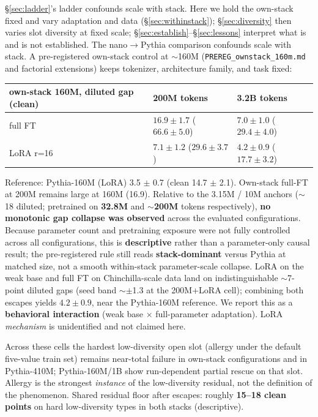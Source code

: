 \documentclass[11pt]{article}
\begin{document}
\S\ref{sec:ladder}'s ladder confounds scale with stack. Here we hold the own-stack fixed and vary adaptation and data (\S\ref{sec:withinstack}); \S\ref{sec:diversity} then varies slot diversity at fixed scale; \S\ref{sec:establish}--\S\ref{sec:lessons} interpret what is and is not established. The nano$\rightarrow$Pythia comparison confounds scale with stack. A pre-registered own-stack control at $\sim$160M (\texttt{PREREG\_ownstack\_160m.md} and factorial extensions) keeps tokenizer, architecture family, and task fixed:

 \begin{center}
\begin{tabular}{lll}
\toprule
own-stack 160M, diluted gap (clean) & 200M tokens & 3.2B tokens \\
\midrule
full FT & $\mathbf{16.9}\pm\mathbf{1.7}$ ($66.6\pm5.0$) & $\mathbf{7.0}\pm\mathbf{1.0}$ ($29.4\pm4.0$) \\
LoRA r=16 & $\mathbf{7.1}\pm\mathbf{1.2}$ ($29.6\pm3.7$) & $\mathbf{4.2}\pm\mathbf{0.9}$ ($17.7\pm3.2$) \\
\bottomrule
\end{tabular}
\end{center}

Reference: Pythia-160M (LoRA) 3.5 $\pm$ 0.7 (clean 14.7 $\pm$ 2.1). Own-stack full-FT at 200M remains large at 160M (16.9). Relative to the 3.15M / 10M anchors ($\sim$18 diluted; pretrained on \textbf{32.8M} and $\sim$\textbf{200M} tokens respectively), \textbf{no monotonic gap collapse was observed} across the evaluated configurations. Because parameter count and pretraining exposure were not fully controlled across all configurations, this is \textbf{descriptive} rather than a parameter-only causal result; the pre-registered rule still reads \textbf{stack-dominant} versus Pythia at matched size, not a smooth within-stack parameter-scale collapse. LoRA on the weak base and full FT on Chinchilla-scale data land on indistinguishable $\sim$7-point diluted gaps (seed band $\sim$$\pm$1.3 at the 200M+LoRA cell); combining both escapes yields $\mathbf{4.2}\pm\mathbf{0.9}$, near the Pythia-160M reference. We report this as a \textbf{behavioral interaction} (weak base $\times$ full-parameter adaptation). LoRA \emph{mechanism} is unidentified and not claimed here.

Across these cells the hardest low-diversity open slot (allergy under the default five-value train set) remains near-total failure in own-stack configurations and in Pythia-410M; Pythia-160M/1B show run-dependent partial rescue on that slot. Allergy is the strongest \emph{instance} of the low-diversity residual, not the definition of the phenomenon. Shared residual floor after escapes: roughly \textbf{15--18 clean points} on hard low-diversity types in both stacks (descriptive).
\end{document}

